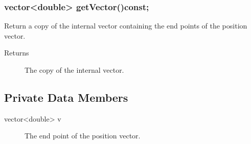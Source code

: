 \subsubsection{vector<double> getVector()const;} 
Return a copy of the internal vector containing the end points 
of the position vector. 
  \begin{description}
       \item [Returns] The copy of the internal vector. 
  \end{description} 


\subsection{Private Data Members}
\begin{description}
 \item [vector<double> v] The end point of the position vector.

 \end{description} 



